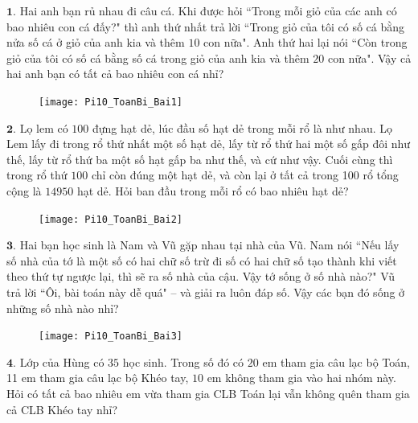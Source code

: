 \begin{multicols}{2}
	$\pmb{1.}$ Hai anh bạn rủ nhau đi câu cá. Khi được hỏi ``Trong mỗi giỏ của các anh có bao nhiêu con cá đấy?" thì anh thứ nhất trả lời ``Trong giỏ của tôi có số cá bằng nửa số cá ở giỏ của anh kia và thêm $10$ con nữa". Anh thứ hai lại nói ``Còn trong giỏ của tôi có số cá bằng số cá trong giỏ của anh kia và thêm $20$ con nữa". Vậy cả hai anh bạn có tất cả bao nhiêu con cá nhỉ? 
	\begin{figure}[H]
			\centering
			\vspace*{-10pt}
			\captionsetup{labelformat= empty, justification=centering}
			\texttt{[image: Pi10\_ToanBi\_Bai1]}
			\vspace*{-15pt}
		\end{figure}
	\vskip 0.1cm
	$\pmb{2.}$ Lọ lem có $100$  đựng hạt dẻ, lúc đầu số hạt dẻ trong mỗi rổ là như nhau. Lọ Lem lấy đi trong rổ thứ nhất một số hạt dẻ, lấy từ rổ  thứ hai một số gấp đôi như thế, lấy từ rổ thứ ba một số hạt gấp ba như thế, và cứ như vậy. Cuối cùng thì trong rổ thứ $100$ chỉ còn đúng một hạt dẻ, và còn lại ở tất cả trong 100 rổ tổng cộng là $14950$ hạt dẻ. Hỏi ban đầu trong mỗi rổ có bao nhiêu hạt dẻ?
	\begin{figure}[H]
			\centering
			\vspace*{-10pt}
			\captionsetup{labelformat= empty, justification=centering}
			\texttt{[image: Pi10\_ToanBi\_Bai2]}
			\vspace*{-15pt}
		\end{figure}
	$\pmb{3.}$ Hai bạn học sinh là Nam và Vũ gặp nhau tại nhà của Vũ. Nam nói ``Nếu lấy số nhà của tớ là một số có hai chữ số trừ đi số có hai chữ số tạo thành khi viết theo thứ tự ngược lại, thì sẽ ra số nhà của cậu. Vậy tớ sống ở số nhà nào?"
	\vskip 0.1cm
	Vũ trả lời ``Ôi, bài toán này dễ quá" -- và giải ra luôn đáp số.
	\vskip 0.1cm
	Vậy các bạn đó sống ở những số nhà nào nhỉ?
	\begin{figure}[H]
			\centering
			\vspace*{-5pt}
			\captionsetup{labelformat= empty, justification=centering}
			\texttt{[image: Pi10\_ToanBi\_Bai3]}
			\vspace*{-15pt}
		\end{figure}
	$\pmb{4.}$ Lớp của Hùng có $35$ học sinh. Trong số đó có $20$ em tham gia câu lạc bộ Toán, 11 em tham gia câu lạc bộ Khéo tay, $10$ em không tham gia vào hai nhóm này. Hỏi có tất cả bao nhiêu em vừa tham gia CLB Toán lại vẫn không quên tham gia cả CLB Khéo tay nhỉ?
	\begin{figure}[H]

\end{figure}
\end{multicols}

